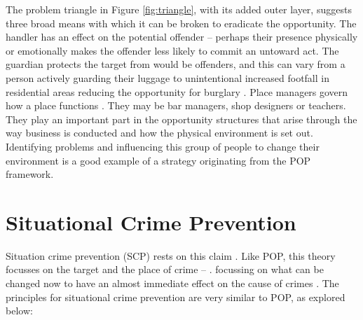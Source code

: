 The problem triangle in  Figure \ref{fig:triangle}, with its added outer layer, suggests three broad means with which it can be broken to eradicate the opportunity. The handler has an effect on the potential offender – perhaps their presence physically or emotionally makes the offender less likely to commit an untoward act. The guardian protects the target from would be offenders, and this can vary from a person actively guarding their luggage to unintentional increased footfall in residential areas reducing the opportunity for burglary  \parencite{halford2020crime}. Place managers govern how a place functions \parencite{popchap11}. They may be bar managers, shop designers or teachers. They play an important part in the opportunity structures that arise through the way business is conducted and how the physical environment is set out. Identifying problems and influencing this group of people to change their environment is a good example of a strategy originating from the POP framework.



\section{Situational Crime Prevention} Situation crime prevention (SCP) rests on this claim \parencite{scpchap13}. Like POP, this theory focusses on the target and the place of crime –   \parencite{clarke1997situational}. focussing on what can be changed now to have an almost immediate effect on the cause of crimes \parencite{clarke1995situational}. The principles for situational crime prevention are very similar to POP, as explored below:

